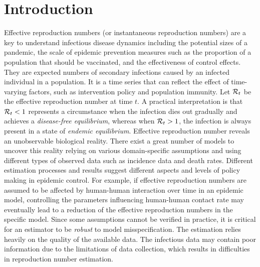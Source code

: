 \section{Introduction}
\label{sec:intro}

Effective reproduction numbers (or instantaneous reproduction numbers) are a key to understand infectious disease dynamics including the potential sizes of a pandemic, the scale of epidemic prevention measures such as the proportion of a population that should be vaccinated, and the effectiveness of control effects. 
They are expected numbers of secondary infections caused by an infected individual in a population. It is a time series that can reflect the effect of time-varying factors, such as intervention policy and population immunity. 
Let $\mathcal{R}_t$ be the effective reproduction number at time $t$. A practical interpretation is that $\mathcal{R}_t < 1$ represents a circumstance when the infection dies out gradually and achieves a \textit{disease-free equilibrium}, whereas when $\mathcal{R}_t > 1$, the infection is always present in a state of \textit{endemic equilibrium}. 
%
Effective reproduction number reveals an unobservable biological reality. 
There exist a great number of models to uncover this reality relying on various domain-specific assumptions and using different types of observed data such as incidence data and death rates. 
Different estimation processes and results suggest different aspects and levels of policy making in epidemic control. For example, if effective reproduction numbers are assumed to be affected by human-human interaction over time in an epidemic model, controlling the parameters influencing human-human contact rate may eventually lead to a reduction of the effective reproduction numbers in the specific model. 
Since some assumptions cannot be verified in practice, it is critical for an estimator to be \textit{robust} to model misspecification. 
The estimation relies heavily on the quality of the available data. 
The infectious data may contain poor information due to the limitations of data collection, which results in difficulties in reproduction number estimation. 

